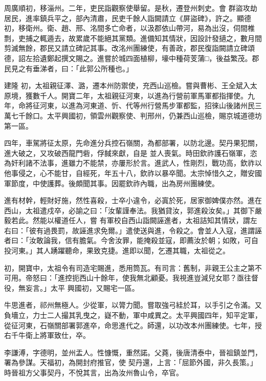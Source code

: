 \begin{pinyinscope}
 周廣順初，移淄州。二年，吏民詣觀察使舉留。是秋，遷登州刺史。會
 群盜攻劫居民，進率鎮兵平之，部內清肅，民吏千餘人詣闕請立《屏盜碑》，許之。顯德初，移衛州。衛、趙、邢、洺間多亡命者，以汲郡依山帶河，易為出沒，伺間椎剽，吏捕之輒遁去，故累歲不能絕其黨類。進備知其情狀，因設計發擿之，數月間剪滅無餘，郡民又請立碑記其事。改洺州團練使，有善政，郡民復詣闕請立碑頌德，詔左拾遺鄭起撰文賜之。進嘗於城四面植柳，壕中種荷芰蒲□，後益繁茂。郡民見之有垂涕者，曰：「此郭公所種也。」



 建隆
 初，太祖親征澤、潞，遷本州防禦使，充西山巡檢。嘗與曹彬、王全斌入太原境，獲數千人。開寶二年，太祖親征河東，以進為行營前軍馬軍都指揮使。九年，命將征河東，以進為河東道、忻、代等州行營馬步軍都監，招徠山後諸州民三萬七千餘口。太平興國初，領雲州觀察使、判邢州，仍兼西山巡檢，賜京城道德坊第一區。



 四年，車駕將征太原，先命進分兵控石嶺關，為都部署，以防北邊。契丹果犯關，進大破之，又攻破西龍門砦，俘馘來獻，自是
 並人喪氣。時田欽祚護石嶺軍，恣為奸利諸不法事，進雖力不能禁，亦屢形於言。進武人，性剛烈，戰功高，欽祚以他事侵之，心不能甘，自經死，年五十八，欽祚以暴卒聞。太宗悼惜久之，贈安國軍節度，中使護葬。後頗聞其事。因罷欽祚內職，出為房州團練使。



 進有材幹，輕財好施，然性喜殺，士卒小違令，必寘於死，居家御婢僕亦然。進在西山，太祖遣戍卒，必諭之曰：「汝輩謹奉法。我猶貸汝，郭進殺汝矣。」其御下嚴毅若此。然能以權道任人，嘗
 有軍校自西山詣闕誣進者，太祖詰知其情狀，謂左右曰：「彼有過畏罰，故誣進求免爾。」遣使送與進，令殺之。會並人入寇，進謂誣者曰：「汝敢論我，信有膽氣。今舍汝罪，能掩殺並寇，即薦汝於朝；如敗，可自投河東。」其人踴躍聽命，果致克捷。進即以聞，乞遷其職，太祖從之。



 初，開寶中，太祖令有司造宅賜進，悉用筒瓦。有司言：舊制，非親王公主之第不可用。帝怒曰：「進控扼西山十餘年，使我無北顧憂。我視進豈減兒女耶？亟往督役，無妄言。」太平
 興國初，又賜宅一區。



 牛思進者，祁州無極人。少從軍，以膂力聞。嘗取強弓絓於耳，以手引之令滿。又負墻立，力士二人撮其乳曳之，嶷不動，軍中咸異之。太平興國四年，知平定軍，從征河東，石嶺關部署郭進卒，命思進代之。師還，以功改本州團練使。七年，授右千牛衛上將軍致仕，卒。



 李謙溥，字德明，並州盂人。性慷慨，重然諾。父蕘，後唐清泰中，晉祖鎮並門，署為參謀。天福初，為開封府推官，使
 契丹還，上言：「屈節外國，非久長策。」時晉祖方父事契丹，不悅其言，出為汝州魯山令，卒官。




\end{pinyinscope}
